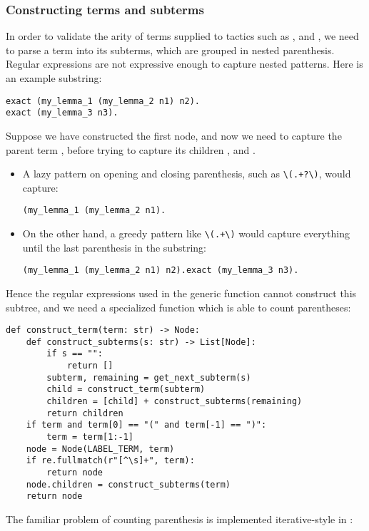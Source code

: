 \subsubsection{Constructing terms and subterms}
In order to validate the arity of terms supplied to tactics such as ,  and , we need to parse a term into its subterms, which are grouped in nested parenthesis. Regular expressions are not expressive enough to capture nested patterns. Here is an example substring:
\begin{verbatim}
exact (my_lemma_1 (my_lemma_2 n1) n2).
exact (my_lemma_3 n3).
\end{verbatim}
Suppose we have constructed the first  node, and now we need to capture the parent term , before trying to capture its children ,  and .
\begin{itemize}
    \item A lazy pattern on opening and closing parenthesis, such as \texttt{\textbackslash(.+?\textbackslash)}, would capture:
          \begin{verbatim}
(my_lemma_1 (my_lemma_2 n1). 
          \end{verbatim}
    \item On the other hand, a greedy pattern like \texttt{\textbackslash(.+\textbackslash)} would capture everything until the last parenthesis in the substring:
          \begin{verbatim}
(my_lemma_1 (my_lemma_2 n1) n2).exact (my_lemma_3 n3).
          \end{verbatim}
\end{itemize}
Hence the regular expressions used in the generic  function cannot construct this subtree, and we need a specialized  function which is able to count parentheses:

\begin{verbatim}
def construct_term(term: str) -> Node:
    def construct_subterms(s: str) -> List[Node]:
        if s == "":
            return []
        subterm, remaining = get_next_subterm(s)
        child = construct_term(subterm)
        children = [child] + construct_subterms(remaining)
        return children
    if term and term[0] == "(" and term[-1] == ")":
        term = term[1:-1]
    node = Node(LABEL_TERM, term)
    if re.fullmatch(r"[^\s]+", term):
        return node
    node.children = construct_subterms(term)
    return node
\end{verbatim}
The familiar problem of counting parenthesis is implemented iterative-style in :

